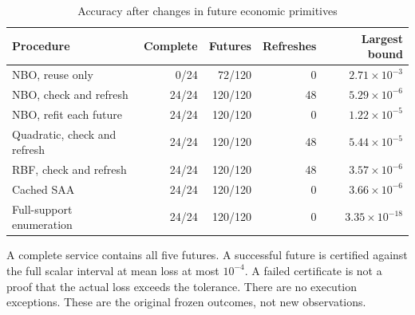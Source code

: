\begin{table}[htbp]\centering\small
\caption{Accuracy after changes in future economic primitives}\label{tab:r21accuracy}
\begin{tabular}{lrrrr}\toprule
Procedure & Complete & Futures & Refreshes & Largest bound\\ \midrule
NBO, reuse only & 0/24 & 72/120 & 0 & $2.71\times10^{-3}$\\
NBO, check and refresh & 24/24 & 120/120 & 48 & $5.29\times10^{-6}$\\
NBO, refit each future & 24/24 & 120/120 & 0 & $1.22\times10^{-5}$\\
Quadratic, check and refresh & 24/24 & 120/120 & 48 & $5.44\times10^{-5}$\\
RBF, check and refresh & 24/24 & 120/120 & 48 & $3.57\times10^{-6}$\\
Cached SAA & 24/24 & 120/120 & 0 & $3.66\times10^{-6}$\\
Full-support enumeration & 24/24 & 120/120 & 0 & $3.35\times10^{-18}$\\
\bottomrule\end{tabular}
\par\smallskip\begin{minipage}{.98\textwidth}\footnotesize A complete service contains all five futures. A successful future is certified against the full scalar interval at mean loss at most $10^{-4}$. A failed certificate is not a proof that the actual loss exceeds the tolerance. There are no execution exceptions. These are the original frozen outcomes, not new observations.\end{minipage}
\end{table}
